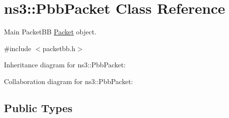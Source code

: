 \hypertarget{classns3_1_1PbbPacket}{}\section{ns3\+:\+:Pbb\+Packet Class Reference}
\label{classns3_1_1PbbPacket}


Main Packet\+BB \hyperlink{classns3_1_1Packet}{Packet} object.  




{\ttfamily \#include $<$packetbb.\+h$>$}



Inheritance diagram for ns3\+:\+:Pbb\+Packet\+:


Collaboration diagram for ns3\+:\+:Pbb\+Packet\+:
\subsection*{Public Types}
